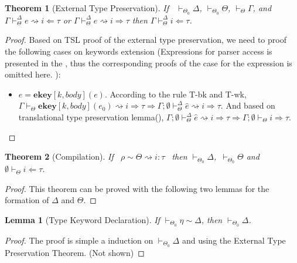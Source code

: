 \documentclass{sig-alternate}
\newcommand{\myvdash}{\vdash_{\Theta}^{\Delta}}
\newtheorem{theorem}{Theorem}
\newtheorem{lemma}{Lemma}
\begin{document}
\begin{theorem}[External Type Preservation]
If ~$\vdash_{\Theta_0}\Delta$, $\vdash_{\Theta_0}\Theta$, $\vdash_{\Theta}\Gamma$, and $\Gamma\myvdash e\rightsquigarrow i\Leftarrow\tau$ or $\Gamma\myvdash e\rightsquigarrow i\Rightarrow\tau$ then $\Gamma\myvdash i\Leftarrow\tau$.
\end{theorem}
\begin{proof}
Based on TSL proof of the external type preservation, we need to proof the following cases on keywords extension (Expressions for parser access is presented in the , thus the corresponding proofs of the case for the expression is omitted here. ):
\begin{itemize}
\item $e=\mathbf{ekey}[k,body](e)$. According to the rule T-bk and T-wk, $\Gamma\vdash_{\Theta}\mathbf{ekey}[k,body](e_0) \rightsquigarrow i \Rightarrow \tau \Longrightarrow \Gamma;\emptyset\myvdash \hat{e} \rightsquigarrow i \Rightarrow \tau$. And based on translational type preservation lemma(), $\Gamma;\emptyset\myvdash \hat{e} \rightsquigarrow i \Rightarrow \tau \Longrightarrow \Gamma;\emptyset\vdash_{\Theta} i\Rightarrow\tau$.
\end{itemize}
\end{proof}

\begin{theorem}[Compilation]
If ~$\rho\sim\Theta\rightsquigarrow i:\tau$~ then $\vdash_{\Theta_0}\Delta$,\ $\vdash_{\Theta_0}\Theta$ and $\emptyset\vdash_{\Theta} i\Leftarrow\tau$.
\end{theorem}
\begin{proof}
This theorem can be proved with the following two lemmas for the formation of $\Delta$ and $\Theta$.
\end{proof}

\begin{lemma}[Type Keyword Declaration] 
If $\vdash_{\Theta_0}\eta\sim\Delta$, then $\vdash_{\Theta_0}\Delta$.
\end{lemma}
\begin{proof}
The proof is simple a induction on $\vdash_{\Theta_0}\Delta$ and using the External Type Preservation Theorem. (Not shown)
\end{proof}
\end{document}
